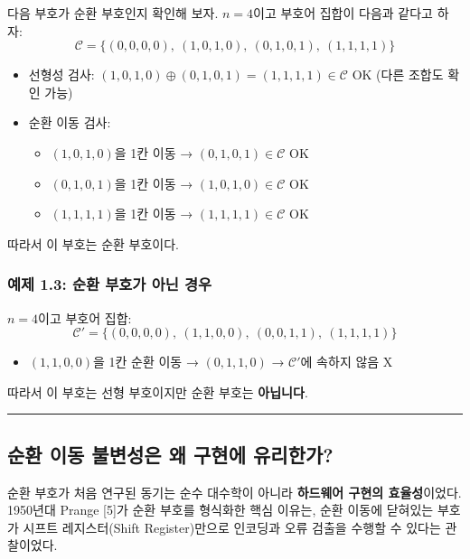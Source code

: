 \documentclass[
  oneside]{article}
\providecommand{\tightlist}{%
  \setlength{\itemsep}{0pt}\setlength{\parskip}{0pt}}
\begin{document}
다음 부호가 순환 부호인지 확인해 보자. \(n = 4\)이고 부호어 집합이
다음과 같다고 하자:
\[\mathcal{C} = \{(0,0,0,0),\ (1,0,1,0),\ (0,1,0,1),\ (1,1,1,1)\}\]

\begin{itemize}
\tightlist
\item
  선형성 검사:
  \((1,0,1,0) \oplus (0,1,0,1) = (1,1,1,1) \in \mathcal{C}\) OK (다른
  조합도 확인 가능)
\item
  순환 이동 검사:

  \begin{itemize}
  \tightlist
  \item
    \((1,0,1,0)\)을 1칸 이동 → \((0,1,0,1) \in \mathcal{C}\) OK
  \item
    \((0,1,0,1)\)을 1칸 이동 → \((1,0,1,0) \in \mathcal{C}\) OK
  \item
    \((1,1,1,1)\)을 1칸 이동 → \((1,1,1,1) \in \mathcal{C}\) OK
  \end{itemize}
\end{itemize}

따라서 이 부호는 순환 부호이다.

\subsubsection{예제 1.3: 순환 부호가 아닌
경우}\label{uxc608uxc81c-1.3-uxc21cuxd658-uxbd80uxd638uxac00-uxc544uxb2cc-uxacbduxc6b0}

\(n = 4\)이고 부호어 집합:
\[\mathcal{C}' = \{(0,0,0,0),\ (1,1,0,0),\ (0,0,1,1),\ (1,1,1,1)\}\]

\begin{itemize}
\tightlist
\item
  \((1,1,0,0)\)을 1칸 순환 이동 → \((0,1,1,0)\) → \(\mathcal{C}'\)에
  속하지 않음 X
\end{itemize}

따라서 이 부호는 선형 부호이지만 순환 부호는 \textbf{아닙니다}.

\begin{center}\rule{0.5\linewidth}{0.5pt}\end{center}

\subsection{순환 이동 불변성은 왜 구현에
유리한가?}\label{uxc21cuxd658-uxc774uxb3d9-uxbd88uxbcc0uxc131uxc740-uxc65c-uxad6cuxd604uxc5d0-uxc720uxb9acuxd55cuxac00}

순환 부호가 처음 연구된 동기는 순수 대수학이 아니라 \textbf{하드웨어
구현의 효율성}이었다. 1950년대 Prange {[}5{]}가 순환 부호를 형식화한
핵심 이유는, 순환 이동에 닫혀있는 부호가 시프트 레지스터(Shift
Register)만으로 인코딩과 오류 검출을 수행할 수 있다는 관찰이었다.
\end{document}
